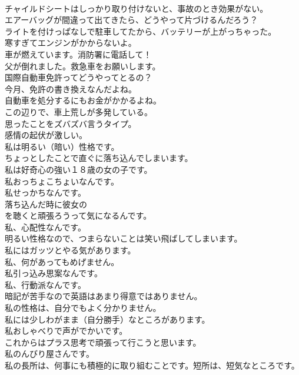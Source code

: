 \documentclass[8pt]{extreport}
\begin{document}
\begin{CJK}{UTF8}{min}
\\	チャイルドシートはしっかり取り付けないと、事故のとき効果がない。	
\\	エアーバッグが間違って出てきたら、どうやって片づけるんだろう？	
\\	ライトを付けっぱなしで駐車してたから、バッテリーが上がっちゃった。	
\\	寒すぎてエンジンがかからないよ。	
\\	車が燃えています。消防署に電話して！	
\\	父が倒れました。救急車をお願いします。	
\\	国際自動車免許ってどうやってとるの？	
\\	今月、免許の書き換えなんだよね。	
\\	自動車を処分するにもお金がかかるよね。	
\\	この辺りで、車上荒しが多発している。	
\\	思ったことをズバズバ言うタイプ。	
\\	感情の起伏が激しい。	
\\	私は明るい（暗い）性格です。	
\\	ちょっとしたことで直ぐに落ち込んでしまいます。	
\\	私は好奇心の強い１８歳の女の子です。	
\\	私おっちょこちょいなんです。	
\\	私せっかちなんです。	
\\	落ち込んだ時に彼女の
\\	を聴くと頑張ろうって気になるんです。	
\\	私、心配性なんです。	
\\	明るい性格なので、つまらないことは笑い飛ばしてしまいます。	
\\	私にはガッツとやる気があります。	
\\	私、何があってもめげません。	
\\	私引っ込み思案なんです。	
\\	私、行動派なんです。	
\\	暗記が苦手なので英語はあまり得意ではありません。	
\\	私の性格は、自分でもよく分かりません。	
\\	私には少しわがまま（自分勝手）なところがあります。	
\\	私おしゃべりで声がでかいです。	
\\	これからはプラス思考で頑張って行こうと思います。	
\\	私のんびり屋さんです。	
\\	私の長所は、何事にも積極的に取り組むことです。短所は、短気なところです。	

\end{CJK}
\end{document}
